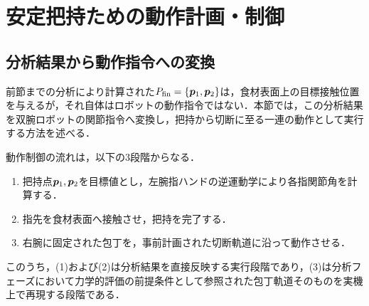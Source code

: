 \begin{algorithm}[!t]
\begin{algorithmic}[1]
    \State {}
    \State {}
    \State {}

     \label{algoline:holding_CalDynamicScoreEach-finalscore-st}
        \State {}
        \State {}
    \EndFor

    \State {}
    \State {} \label{algoline:holding_sub-return}
    
\EndFunction
\end{algorithmic}
\end{algorithm}


\section{安定把持ための動作計画・制御}
\label{sec:holding_control}

\subsection{分析結果から動作指令への変換}
\label{subsec:holding_execution}

前節までの分析により計算された{\nameholdingpointset}$\equholdingpointset[fin]=\{\equfingerpoint[][1],\equfingerpoint[][2]\}$は，食材表面上の目標接触位置を与えるが，それ自体はロボットの動作指令ではない．本節では，この分析結果を双腕ロボットの関節指令へ変換し，把持から切断に至る一連の動作として実行する方法を述べる．

動作制御の流れは，以下の3段階からなる．
\begin{enumerate}
    \item 把持点$\equfingerpoint[][1],\equfingerpoint[][2]$を目標値とし，左腕指ハンドの逆運動学により各指関節角を計算する．
    \item 指先を食材表面へ接触させ，把持を完了する．
    \item 右腕に固定された包丁を，事前計画された切断軌道に沿って動作させる．
\end{enumerate}
このうち，(1)および(2)は分析結果を直接反映する実行段階であり，(3)は分析フェーズにおいて力学的評価の前提条件として参照された包丁軌道そのものを実機上で再現する段階である．


